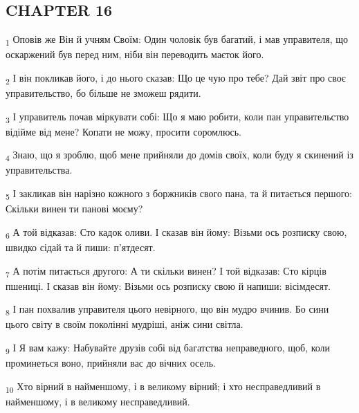 \subsection{CHAPTER 16}
\begin{tcolorbox}
\textsubscript{1} Оповів же Він й учням Своїм: Один чоловік був багатий, і мав управителя, що оскаржений був перед ним, ніби він переводить маєток його.
\end{tcolorbox}
\begin{tcolorbox}
\textsubscript{2} І він покликав його, і до нього сказав: Що це чую про тебе? Дай звіт про своє управительство, бо більше не зможеш рядити.
\end{tcolorbox}
\begin{tcolorbox}
\textsubscript{3} І управитель почав міркувати собі: Що я маю робити, коли пан управительство відійме від мене? Копати не можу, просити соромлюсь.
\end{tcolorbox}
\begin{tcolorbox}
\textsubscript{4} Знаю, що я зроблю, щоб мене прийняли до домів своїх, коли буду я скинений із управительства.
\end{tcolorbox}
\begin{tcolorbox}
\textsubscript{5} І закликав він нарізно кожного з боржників свого пана, та й питається першого: Скільки винен ти панові моєму?
\end{tcolorbox}
\begin{tcolorbox}
\textsubscript{6} А той відказав: Сто кадок оливи. І сказав він йому: Візьми ось розписку свою, швидко сідай та й пиши: п'ятдесят.
\end{tcolorbox}
\begin{tcolorbox}
\textsubscript{7} А потім питається другого: А ти скільки винен? І той відказав: Сто кірців пшениці. І сказав він йому: Візьми ось розписку свою й напиши: вісімдесят.
\end{tcolorbox}
\begin{tcolorbox}
\textsubscript{8} І пан похвалив управителя цього невірного, що він мудро вчинив. Бо сини цього світу в своїм поколінні мудріші, аніж сини світла.
\end{tcolorbox}
\begin{tcolorbox}
\textsubscript{9} І Я вам кажу: Набувайте друзів собі від багатства неправедного, щоб, коли проминеться воно, прийняли вас до вічних осель.
\end{tcolorbox}
\begin{tcolorbox}
\textsubscript{10} Хто вірний в найменшому, і в великому вірний; і хто несправедливий в найменшому, і в великому несправедливий.
\end{tcolorbox}
